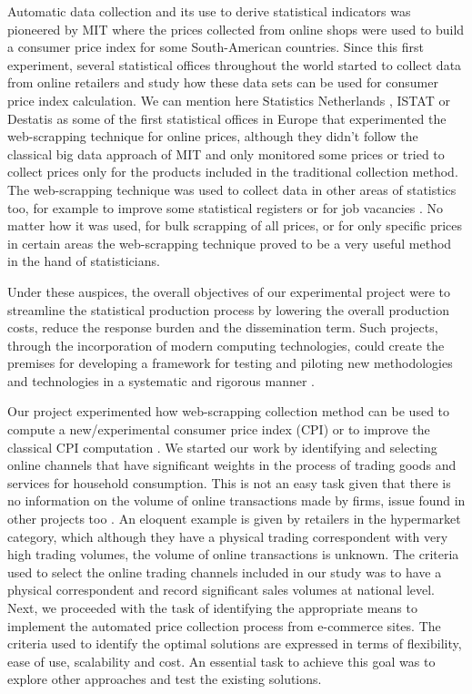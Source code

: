 \documentclass[]{article}
\begin{document}
Automatic data collection and its use to derive statistical indicators was pioneered by MIT \cite{MIT} where the prices collected 
from online shops were used to build a consumer price index for some South-American countries. Since this first experiment, several
statistical offices throughout the world started to collect data from online retailers and study how these data sets can be used
for consumer price index calculation. We can mention here Statistics Netherlands \cite{cbs}, ISTAT \cite{polidoro}  
or Destatis \cite{bruner} as some of the first statistical offices in Europe that experimented the web-scrapping technique for online prices, 
although they didn't follow the classical big data approach of MIT and only monitored some prices or tried to collect prices
only for the products included in the traditional collection method. The web-scrapping technique was used to collect data in other areas
of statistics too, for example to improve some statistical registers \cite{barcoli} or for job vacancies \cite{swier2}.
No matter how it was used, for bulk scrapping of all prices, or for only specific prices in certain areas \cite{cbs2} the web-scrapping technique 
proved to be a very useful method in the hand of statisticians.


Under these auspices, the overall objectives of our experimental project were to streamline the statistical production process by 
lowering the overall production costs, reduce the response burden and the dissemination term. Such projects, through the incorporation 
of modern computing technologies, could create the premises for developing a framework for testing and piloting new methodologies 
and technologies in a systematic and rigorous manner \cite{ons2017}. 


Our project experimented how web-scrapping collection method can be used to compute a new/experimental 
consumer price index (CPI) or to improve the classical CPI computation \cite{otawa2017}. We started our work by identifying and 
selecting online channels that have significant weights in the process of trading goods and services for household consumption. 
This is not an easy task given that there is no information on the volume of online transactions made by firms, 
issue found in other projects too \cite{willenborg2017}. An eloquent 
example is given by retailers in the hypermarket category, which although they have a physical trading correspondent with very high 
trading volumes, the volume of online transactions is unknown. The criteria used to select the online trading channels included in 
our study was to have a physical correspondent and record significant sales volumes at national level. Next, we proceeded with the 
task of identifying the appropriate means to implement the automated price collection process from e-commerce sites. The criteria 
used to identify the optimal solutions are expressed in terms of flexibility, ease of use, scalability and cost. An essential task 
to achieve this goal was to explore other approaches and test the existing solutions. 
\end{document}
